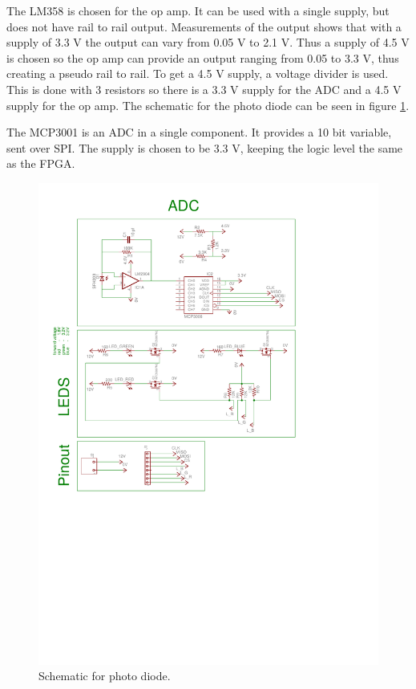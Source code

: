 The LM358 is chosen for the op amp.
It can be used with a single supply, but does not have rail to rail output.
Measurements of the output shows that with a supply of 3.3 V the output can vary from 0.05 V to 2.1 V.
Thus a supply of 4.5 V is chosen so the op amp can provide an output ranging from 0.05 to 3.3 V, thus creating a pseudo rail to rail.
To get a 4.5 V supply, a voltage divider is used. This is done with 3 resistors so there is a 3.3 V supply for the ADC and a 4.5 V supply for the op amp.
The schematic for the photo diode can be seen in figure \ref{fig:sch_photo_diode}.

The MCP3001 is an ADC in a single component.
It provides a 10 bit variable, sent over SPI.
The supply is chosen to be 3.3 V, keeping the logic level the same as the FPGA.

\begin{figure}[ht]
\centering%
 \includegraphics[scale=0.9,trim={2.4cm 20.8cm 5.1cm 2.2cm},clip]{img/adc_schematic.pdf}
  \caption{Schematic for photo diode.}
  \label{fig:sch_photo_diode}
\end{figure}

